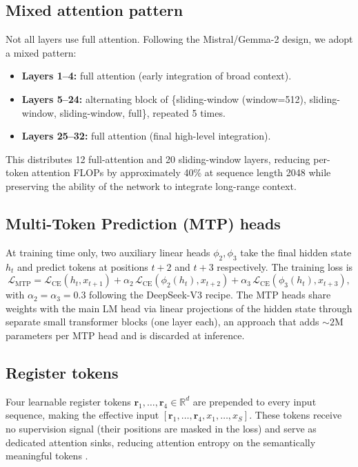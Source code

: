 \documentclass[11pt,a4paper]{article}
\theoremstyle{definition}
\theoremstyle{remark}
\newcommand{\R}{\mathbb{R}}
\begin{document}
\subsection{Mixed attention pattern}
\label{sec:attnpattern}

Not all layers use full attention. Following the Mistral/Gemma-2 design,
we adopt a mixed pattern:
\begin{itemize}[leftmargin=1.5em,itemsep=0.2em]
    \item \textbf{Layers 1--4:} full attention (early integration of
          broad context).
    \item \textbf{Layers 5--24:} alternating block of
          \{sliding-window (window=512), sliding-window, sliding-window, full\},
          repeated 5 times.
    \item \textbf{Layers 25--32:} full attention (final high-level
          integration).
\end{itemize}
This distributes 12 full-attention and 20 sliding-window layers, reducing
per-token attention FLOPs by approximately 40\% at sequence length 2048
while preserving the ability of the network to integrate long-range
context.

\subsection{Multi-Token Prediction (MTP) heads}
\label{sec:mtp}

At training time only, two auxiliary linear heads $\phi_2, \phi_3$ take the
final hidden state $h_t$ and predict tokens at positions $t+2$ and $t+3$
respectively. The training loss is
\begin{equation}
\mathcal{L}_\text{MTP}
   = \mathcal{L}_\text{CE}(h_t, x_{t+1})
   + \alpha_2\, \mathcal{L}_\text{CE}(\phi_2(h_t), x_{t+2})
   + \alpha_3\, \mathcal{L}_\text{CE}(\phi_3(h_t), x_{t+3}),
\end{equation}
with $\alpha_2 = \alpha_3 = 0.3$ following the DeepSeek-V3 recipe.
The MTP heads share weights with the main LM head via linear projections
of the hidden state through separate small transformer blocks
(one layer each), an approach that adds $\sim 2$M parameters per MTP head
and is discarded at inference.

\subsection{Register tokens}
\label{sec:registers}

Four learnable register tokens $\mathbf{r}_1, \dots, \mathbf{r}_4 \in \R^d$ are
prepended to every input sequence, making the effective input
$[\mathbf{r}_1, \dots, \mathbf{r}_4, x_1, \dots, x_S]$. These tokens receive
no supervision signal (their positions are masked in the loss) and serve
as dedicated attention sinks, reducing attention entropy on the
semantically meaningful tokens \citep{darcet2024registers}.
\end{document}
